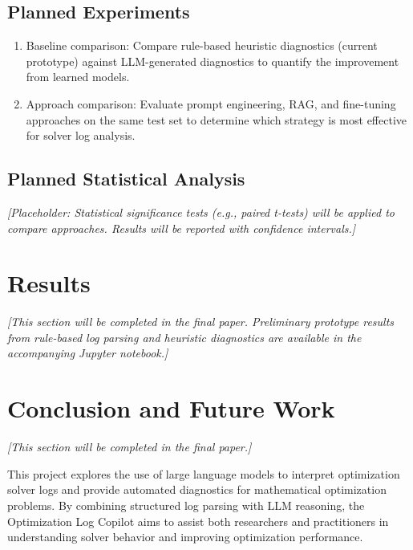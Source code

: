 \documentclass[11pt]{article}
\begin{document}
\subsection{Planned Experiments}

\begin{enumerate}
    \item Baseline comparison: Compare rule-based heuristic diagnostics (current prototype) against LLM-generated diagnostics to quantify the improvement from learned models.
    \item Approach comparison: Evaluate prompt engineering, RAG, and fine-tuning approaches on the same test set to determine which strategy is most effective for solver log analysis.    
\end{enumerate}

\subsection{Planned Statistical Analysis}

\textit{[Placeholder: Statistical significance tests (e.g., paired t-tests) will be applied to compare approaches. Results will be reported with confidence intervals.]}

\section{Results}
\label{sec:results}

\textit{[This section will be completed in the final paper. Preliminary prototype results from rule-based log parsing and heuristic diagnostics are available in the accompanying Jupyter notebook.]}

\section{Conclusion and Future Work}
\label{sec:conclusion}

\textit{[This section will be completed in the final paper.]}

This project explores the use of large language models to interpret optimization solver logs and provide automated diagnostics for mathematical optimization problems. By combining structured
log parsing with LLM reasoning, the Optimization Log Copilot aims to assist both researchers and practitioners in understanding solver behavior and improving optimization performance.
\end{document}
